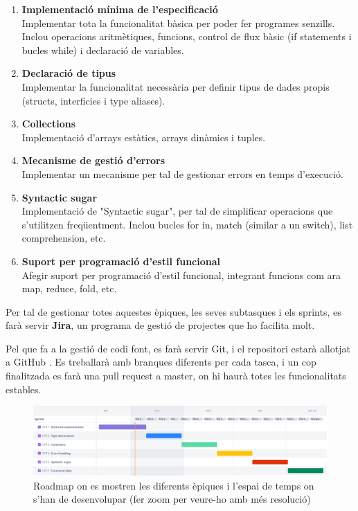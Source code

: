 ﻿\documentclass{article}
\begin{document}
\begin{enumerate}
    \item \textbf{Implementació mínima de l'especificació}\\
        Implementar tota la funcionalitat bàsica per poder fer programes senzills.
        Inclou operacions aritmètiques, funcions, control de flux bàsic (if
        statements i bucles while) i declaració de variables.

    \item \textbf{Declaració de tipus} \\
        Implementar la funcionalitat necessària per definir tipus de dades
        propis (structs, interficies i type aliases).

    \item \textbf{Collections}\\
        Implementació d'arrays estàtics, arrays dinàmics i tuples.

    \item \textbf{Mecanisme de gestió d'errors}\\
        Implementar un mecanisme per tal de gestionar errors en temps d'execució.

    \item \textbf{Syntactic sugar}\\
        Implementació de "Syntactic sugar", per tal de simplificar operacions
        que s'utilitzen freqüentment. Inclou bucles for in, match (similar a un
        switch), list comprehension, etc.

    \item \textbf{Suport per programació d'estil funcional}\\
        Afegir suport per programació d'estil funcional, integrant funcions com
        ara map, reduce, fold, etc.
\end{enumerate}

Per tal de gestionar totes aquestes èpiques, les seves subtasques i els sprints,
es farà servir \textbf{Jira}, un programa de gestió de projectes que ho facilita molt.

Pel que fa a la gestió de codi font, es farà servir Git, i el repositori estarà
allotjat a GitHub \cite{repo}. Es treballarà amb branques diferents per cada
tasca, i un cop finalitzada es farà una pull request a master, on hi haurà
totes les funcionalitats estables.

\begin{figure}
    \includegraphics[width=\linewidth]{roadmap}
    \centering
    \captionsetup{justification=centering}
    \caption{Roadmap on es mostren les diferents èpiques i l'espai de temps on s'han de desenvolupar (fer zoom per veure-ho amb més resolució)}
\end{figure}
\end{document}
